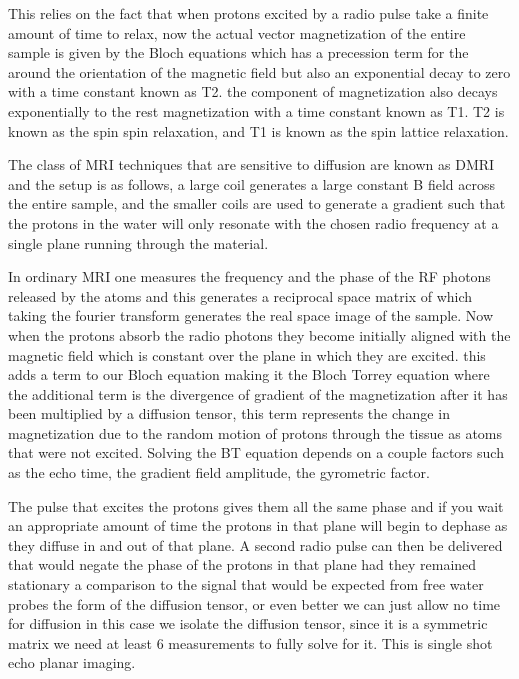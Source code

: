 This relies on the fact that when protons excited by a radio pulse take a finite amount of time to relax, now the actual vector magnetization of the entire sample is given by the Bloch equations which has a precession term for the around the orientation of the magnetic field but also an exponential decay to zero with a time constant known as T2. the component of magnetization also decays exponentially to the rest magnetization with a time constant known as T1. T2 is known as the spin spin relaxation, and T1 is known as the spin lattice relaxation.

The class of MRI techniques that are sensitive to diffusion are known as DMRI and the setup is as follows, a large coil generates a large constant B field across the entire sample, and the smaller coils are used to generate a gradient such that the protons in the water will only resonate with the chosen radio frequency at a single plane running through the material.

In ordinary MRI one  measures the frequency and the phase of the RF photons released by the atoms and this generates a reciprocal space matrix of which taking the fourier transform generates the real space image of the sample. Now when the protons absorb the radio photons they become initially aligned with the magnetic field which is constant over the plane in which they are excited. this adds a term to our Bloch equation making it the Bloch Torrey equation where the additional term is the divergence of gradient of the magnetization after it has been multiplied by a diffusion tensor, this term represents the change in magnetization due to the random motion of protons through the tissue as atoms that were not excited. Solving the BT equation depends on a couple factors such as the echo time, the gradient field amplitude, the gyrometric factor.

The pulse that excites the protons gives them all the same phase and if you wait an appropriate amount of time the protons in that plane will begin to dephase as they diffuse in and out of that plane. A second radio pulse can then be delivered that would negate the phase of the protons in that plane had they remained stationary a comparison to the signal that would be expected from free water probes the form of the diffusion tensor, or even better we can just allow no time for diffusion in this case we isolate the diffusion tensor, since it is a symmetric matrix we need at least 6 measurements to fully solve for it. This is single shot echo planar imaging.

